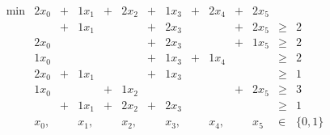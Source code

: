 \[\begin{array}{rccccccccccccl}
\min & 2 x_{0}& + & 1 x_{1}& + & 2 x_{2}& + & 1 x_{3}& + & 2 x_{4}& + & 2 x_{5}&&\\
 & & + & 1 x_{1}&&& + & 2 x_{3}&&& + & 2 x_{5}&\geq& 2 \\
 & 2 x_{0}&&&&& + & 2 x_{3}&&& + & 1 x_{5}&\geq& 2 \\
 & 1 x_{0}&&&&& + & 1 x_{3}& + & 1 x_{4}&&&\geq& 2 \\
 & 2 x_{0}& + & 1 x_{1}&&& + & 1 x_{3}&&&&&\geq& 1 \\
 & 1 x_{0}&&& + & 1 x_{2}&&&&& + & 2 x_{5}&\geq& 3 \\
 & & + & 1 x_{1}& + & 2 x_{2}& + & 2 x_{3}&&&&&\geq& 1 \\
&x_{0}, &&x_{1}, &&x_{2}, &&x_{3}, &&x_{4}, &&x_{5} &\in& \{0,1\}
\end{array}\]